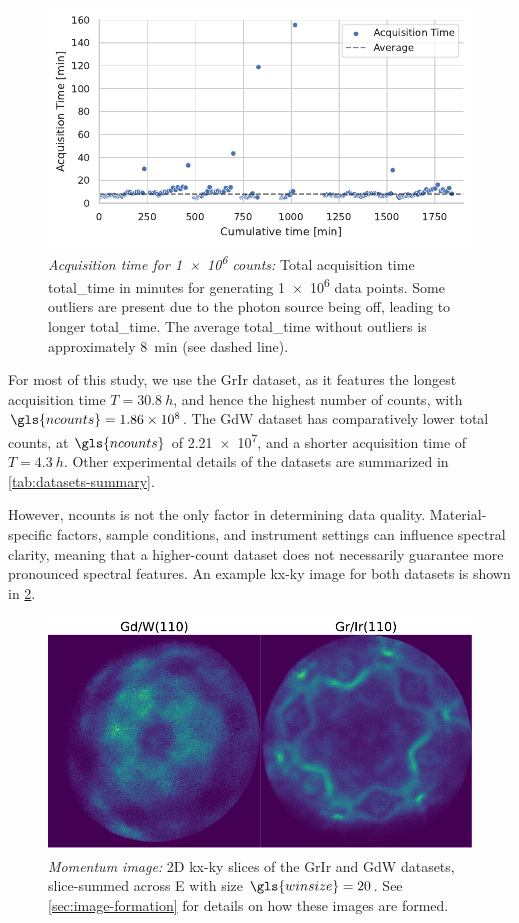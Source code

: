 \begin{figure}
    \centering
    \includegraphics[width=0.8\linewidth]{images/acq_time_1M.pdf}
    \caption{\textit{Acquisition time for \num{1e6} counts:} Total acquisition time \gls{total_time} in minutes for generating \num{1e6} data points. Some outliers are present due to the photon source being off, leading to longer \gls{total_time}. The average \gls{total_time} without outliers is approximately \qty{8}{min} (see dashed line).}
    \label{fig:acq-time-1M}
\end{figure}

For most of this study, we use the \gls{GrIr} dataset, as it features the longest acquisition time $T=\qty{30.8}{h}$, and hence the highest number of counts, with $\gls{ncounts}=\num{1.86e8}$. The \gls{GdW} dataset has comparatively lower total counts, at $\gls{ncounts}$ of \num{2.21e7}, and a shorter acquisition time of $T=\qty{4.3}{h}$. Other experimental details of the datasets are summarized in \cref{tab:datasets-summary}.

However, \gls{ncounts} is not the only factor in determining data quality. Material-specific factors, sample conditions, and instrument settings can influence spectral clarity, meaning that a higher-count dataset does not necessarily guarantee more pronounced spectral features. An example \gls{kx}-\gls{ky} image for both datasets is shown in \cref{fig:all-hextof-datasets-kxky}.

\begin{figure}
    \centering
    \includegraphics[width=0.7\linewidth]{images/datasets_2_kx_ky.pdf}
    \caption{\textit{Momentum image:} 2D \gls{kx}-\gls{ky} slices of the \gls{GrIr} and \gls{GdW} datasets, slice-summed across \gls{E} with size $\gls{winsize}=\num{20}$. See \cref{sec:image-formation} for details on how these images are formed.}
    \label{fig:all-hextof-datasets-kxky}
\end{figure}

